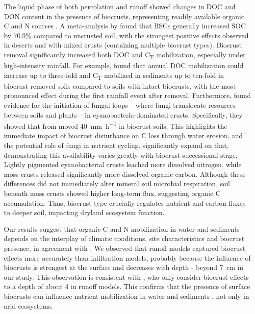 The liquid phase of both percolation and runoff showed changes in DOC and DON content in the presence of biocrusts, representing readily available organic C and N sources \citep{Bernal2005}. A meta-analysis by \citet{Xu2022} found that BSCs generally increased SOC by 70.9\% compared to uncrusted soil, with the strongest positive effects observed in deserts and with mixed crusts (containing multiple biocrust types). Biocrust removal significantly increased both DOC and C\textsubscript{T} mobilization, especially under high-intensity rainfall. For example, \citet{Chamizo2017} found that annual DOC mobilization could increase up to three-fold and C\textsubscript{T} mobilized in sediments up to ten-fold in biocrust-removed soils compared to soils with intact biocrusts, with the most pronounced effect during the first rainfall event after removal. Furthermore, \citet{Aanderud2018} found evidence for the initiation of fungal loops -- where fungi translocate resources between soils and plants -- in cyanobacteria-dominated crusts. Specifically, they showed that  from  moved \SI{40}{\milli\metre\per\hour} in biocrust soils. This highlights the immediate impact of biocrust disturbance on C loss through water erosion, and the potential role of fungi in nutrient cycling. \citet{Young2022} significantly expand on that, demonstrating this availability varies greatly with biocrust successional stage. Lightly pigmented cyanobacterial crusts leached more dissolved nitrogen, while moss crusts released significantly more dissolved organic carbon. Although these differences did not immediately alter mineral soil microbial respiration, soil beneath moss crusts showed higher long-term  flux, suggesting organic C accumulation. Thus, biocrust type crucially regulates nutrient and carbon fluxes to deeper soil, impacting dryland ecosystem function.

Our results suggest that organic C and N mobilization in water and sediments depends on the interplay of climatic conditions, site characteristics and biocrust presence, in agreement with \citet{Austin2004}. We observed that runoff models captured biocrust effects more accurately than infiltration models, probably because the influence of biocrusts is strongest at the surface and decreases with depth - beyond \SI{7}{\centi\meter} in our study. This observation is consistent with \citet{Williams2022}, who only consider biocrust effects to a depth of about {4}{\centi\meter} in runoff models. This confirms that the presence of surface biocrusts can influence nutrient mobilization in water and sediments \citep{Belnap2003,RodriguezCaballero2013}, not only in arid ecosystems.

